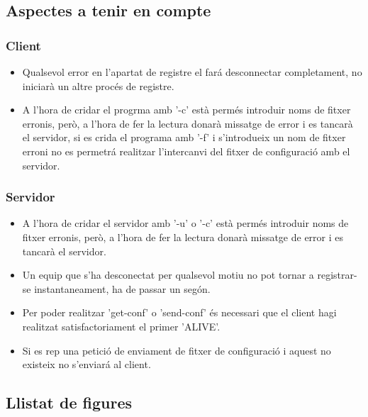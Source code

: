 \documentclass[11pt]{article}
\begin{document}
	\subsection{Aspectes a tenir en compte}
	\subsubsection*{Client}
\begin{itemize}
\item Qualsevol error en l'apartat de registre el fará desconnectar completament, no iniciarà un altre procés de registre.
\item A l'hora de cridar el progrma amb '-c' està permés introduir noms de fitxer erronis, però, a l'hora de fer la lectura donarà missatge de error i es tancarà el servidor, si es crida el programa amb '-f' i s'introdueix un nom de fitxer erroni no es permetrá realitzar l'intercanvi del fitxer de configuració amb el servidor.
\end{itemize} 
	 \subsubsection*{Servidor}
\begin{itemize}
\item A l'hora de cridar el servidor amb '-u' o '-c' està permés introduir noms de fitxer erronis, però, a l'hora de fer la lectura donarà missatge de error i es tancarà el servidor.
\item Un equip que s'ha desconectat per qualsevol motiu no pot tornar a registrar-se instantaneament, ha de passar un segón.
\item Per poder realitzar 'get-conf' o 'send-conf' és necessari que el client hagi realitzat satisfactoriament el primer 'ALIVE'.
\item Si es rep una petició de enviament de fitxer de configuració i aquest no existeix no s'enviará al client.
\end{itemize}	
	
	\subsection{Llistat de figures}
\listoffigures{}
\newpage
\end{document}
